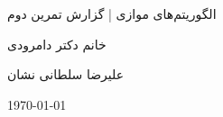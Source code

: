 \documentclass[20pt, a4paper]{article}
\begin{document}
\centerline{الگوریتم‌های موازی | گزارش تمرین دوم}
\centerline {خانم دکتر دامرودی}
\centerline{علیرضا سلطانی نشان}
\centerline{\today}
\end{document}
